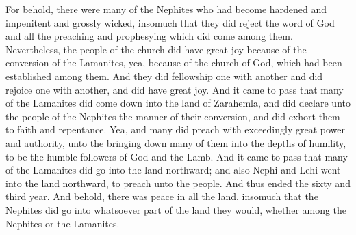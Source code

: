 \bverse \iffalse For behold, there were many of the Nephites who had become hardened and impenitent and grossly wicked, insomuch that they did reject the word of God and all the preaching and prophesying which did come among them. \fi
For behold, there were many of the Nephites who had become hardened and impenitent and grossly wicked, insomuch that they did reject the word of God and all the preaching and prophesying which did come among them.
\bverse \iffalse Nevertheless, the people of the church did have great joy because of the conversion of the Lamanites, yea, because of the church of God, which had been established among them. And they did fellowship one with another and did rejoice one with another, and did have great joy. \fi
Nevertheless, the people of the church did have great joy because of the conversion of the Lamanites, yea, because of the church of God, which had been established among them. And they did fellowship one with another and did rejoice one with another, and did have great joy.
\bverse \iffalse And it came to pass that many of the Lamanites did come down into the land of Zarahemla, and did declare unto the people of the Nephites the manner of their conversion, and did exhort them to faith and repentance. \fi
And it came to pass that many of the Lamanites did come down into the land of Zarahemla, and did declare unto the people of the Nephites the manner of their conversion, and did exhort them to faith and repentance.
\bverse \iffalse Yea, and many did preach with exceedingly great power and authority, unto the bringing down many of them into the depths of humility, to be the humble followers of God and the Lamb. \fi
Yea, and many did preach with exceedingly great power and authority, unto the bringing down many of them into the depths of humility, to be the humble followers of God and the Lamb.
\bverse \iffalse And it came to pass that many of the Lamanites did go into the land northward; and also Nephi and Lehi went into the land northward, to preach unto the people. And thus ended the sixty and third year. \fi
And it came to pass that many of the Lamanites did go into the land northward; and also Nephi and Lehi went into the land northward, to preach unto the people. And thus ended the sixty and third year.
\bverse \iffalse And behold, there was peace in all the land, insomuch that the Nephites did go into whatsoever part of the land they would, whether among the Nephites or the Lamanites. \fi
And behold, there was peace in all the land, insomuch that the Nephites did go into whatsoever part of the land they would, whether among the Nephites or the Lamanites.

